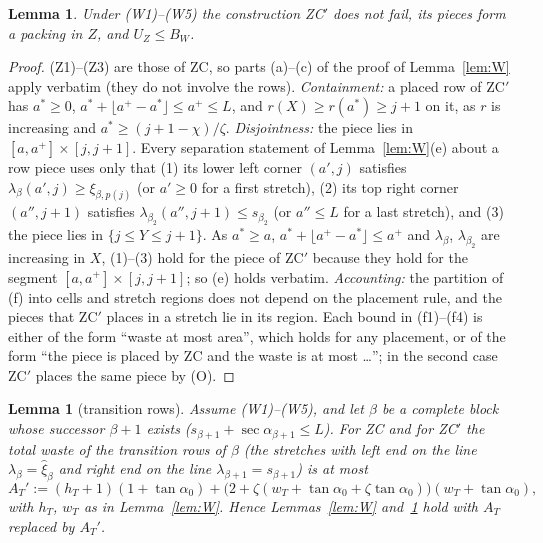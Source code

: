 \documentclass[11pt]{amsart}
\newcommand{\taz}{\tan\alpha_0}
\newtheorem{lemma}[theorem]{Lemma}
\theoremstyle{definition}
\theoremstyle{remark}
\numberwithin{equation}{section}
\begin{document}
\begin{lemma}\label{lem:P3a}
Under (W1)--(W5) the construction ZC$'$ does not fail, its pieces form a packing in $Z$, and $U_Z\le B_W$.
\end{lemma}

\begin{proof}
(Z1)--(Z3) are those of ZC, so parts (a)--(c) of the proof of Lemma~\ref{lem:W} apply verbatim (they do not involve the
rows). \emph{Containment:} a placed row of ZC$'$ has $a^*\ge0$, $a^*+\lfloor a^+-a^*\rfloor\le a^+\le L$, and
$r(X)\ge r(a^*)\ge j+1$ on it, as $r$ is increasing and $a^*\ge(j+1-\chi)/\zeta$. \emph{Disjointness:} the piece lies in
$[a,a^+]\times[j,j+1]$. Every separation statement of Lemma~\ref{lem:W}(e) about a row piece uses only that (1) its lower
left corner $(a',j)$ satisfies $\lambda_\beta(a',j)\ge\xi_{\beta,p(j)}$ (or $a'\ge0$ for a first stretch), (2) its top
right corner $(a'',j+1)$ satisfies $\lambda_{\beta_2}(a'',j+1)\le s_{\beta_2}$ (or $a''\le L$ for a last stretch), and
(3) the piece lies in $\{j\le Y\le j+1\}$. As $a^*\ge a$, $a^*+\lfloor a^+-a^*\rfloor\le a^+$ and $\lambda_\beta$,
$\lambda_{\beta_2}$ are increasing in $X$, (1)--(3) hold for the piece of ZC$'$ because they hold for the segment
$[a,a^+]\times[j,j+1]$; so (e) holds verbatim. \emph{Accounting:} the partition of (f) into cells and stretch regions
does not depend on the placement rule, and the pieces that ZC$'$ places in a stretch lie in its region. Each bound in
(f1)--(f4) is either of the form ``waste at most area'', which holds for any placement, or of the form ``the piece is
placed by ZC and the waste is at most \dots''; in the second case ZC$'$ places the same piece by (O).
\end{proof}

\begin{lemma}[transition rows]\label{lem:P2}
Assume (W1)--(W5), and let $\beta$ be a complete block whose successor $\beta+1$ exists ($s_{\beta+1}+\sec\alpha_{\beta+1}
\le L$). For ZC and for ZC$'$ the total waste of the transition rows of $\beta$ (the stretches with left end on the line
$\lambda_\beta=\hat\xi_\beta$ and right end on the line $\lambda_{\beta+1}=s_{\beta+1}$) is at most
\[
A_T':=(h_T+1)(1+\taz)+\bigl(2+\zeta(w_T+\taz+\zeta\taz)\bigr)(w_T+\taz),
\]
with $h_T$, $w_T$ as in Lemma~\ref{lem:W}. Hence Lemmas~\ref{lem:W} and~\ref{lem:P3a} hold with $A_T$ replaced by $A_T'$.
\end{lemma}
\end{document}
